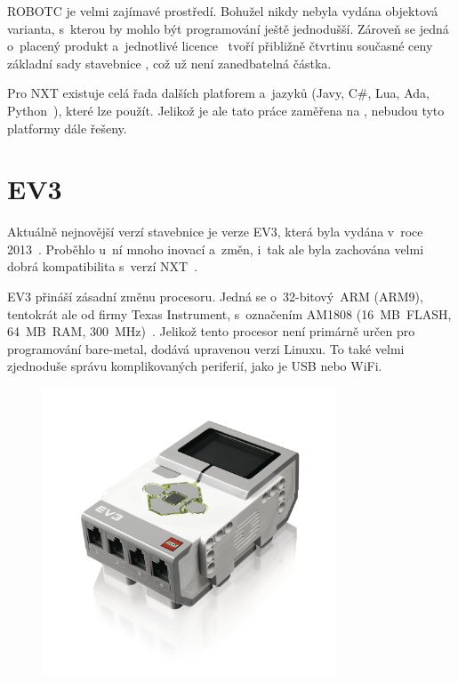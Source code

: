 ROBOTC je velmi zajímavé prostředí. Bohužel nikdy nebyla vydána objektová varianta, s~kterou by mohlo být programování ještě jednodušší. 
Zároveň se jedná o~placený produkt a~jednotlivé licence~\cite{legoProgramingPlatform_ROBOTC-price} tvoří přibližně čtvrtinu současné ceny základní sady stavebnice \legoEV{~}\cite{lego_eduxeEshop_CoreSet}, což už není zanedbatelná částka.

Pro NXT existuje celá řada dalších platforem a~jazyků (Javy, C\#, Lua, Ada, Python~\cite{legoMindstormsNXT_Programming}), které lze použít. 
Jelikož je ale tato práce zaměřena na \legoEV{ }, nebudou tyto platformy dále řešeny. 

\section{\legoM{ }EV3}

Aktuálně nejnovější verzí stavebnice \legoM{ }je verze EV3, která byla vydána v~roce 2013~\cite{lego_mindstormsHistory}. 
Proběhlo u~ní mnoho inovací a~změn, i~tak ale byla zachována velmi dobrá kompatibilita s~verzí NXT~\cite{legoRobotSquare_EV3-and-NXT-compatibility}.

EV3 přináší zásadní změnu procesoru. 
Jedná se o~32-bitový~ARM (ARM9), tentokrát ale od firmy Texas Instrument, s~označením AM1808 (16~MB~FLASH, 64~MB~RAM, 300~MHz)~\cite{legoMindstormsEV3_fw-dev-kit}. 
Jelikož tento procesor není primárně určen pro programování bare-metal, \lego{ } dodává upravenou verzi Linuxu. To také velmi zjednoduše správu komplikovaných periferií, jako je USB nebo WiFi. %

\begin{figure}[h]
	\centering
	\includegraphics[width=330px]{images/lego-mindstorms-ev3_brick.jpg}
	\caption[]{\legoEV{ \brick}\protect\footnotemark}
	\label{fig:lego-mindstorms-ev3_brick}
\end{figure}

